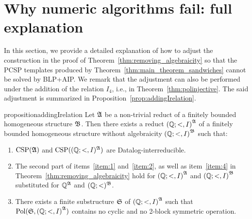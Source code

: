 \section{Why numeric algorithms fail: full explanation}  

 In this section, we provide a detailed explanation of how to adjust the construction in the proof of Theorem~\ref{thm:removing_algebraicity} so that the PCSP templates produced by Theorem~\ref{thm:main_theorem_sandwiches} cannot be solved by BLP+AIP.
 We remark that the adjustment can also be performed under the addition of the relation $I_4$, i.e., in Theorem~\ref{thm:polinjective}.  
%
The said adjustment is summarized in Proposition~\ref{prop:addingIrelation}.
%
\begin{restatable}{proposition}{addingIrelation}    \label{prop:addingIrelation}
    Let $\mathfrak{A}$ be a non-trivial reduct of a finitely bounded homogeneous structure $\mathfrak{B}$.
    Then there exists a reduct ${(\mathbb{Q};<,I)}^{\mathfrak{A}}$ of a finitely bounded homogeneous structure without algebraicity ${(\mathbb{Q};<,I)}^{\mathfrak{B}}$ such that:
    \begin{enumerate}
        \item \label{item:addingIdatalog} $\mathrm{CSP}(\mathfrak{A})$ and  $\mathrm{CSP}((\mathbb{Q};<,I)^{\mathfrak{A}})$ are Datalog-interreducible.
        \item \label{item:removingalgebitems} The second part of items~\ref{item:1} and~\ref{item:2}, as well as item~\ref{item:4} in Theorem~\ref{thm:removing_algebraicity} hold for ${(\mathbb{Q};<,I)}^{\mathfrak{A}}$ and ${(\mathbb{Q};<,I)}^{\mathfrak{B}}$ substituted for $\mathbb{Q}^{\mathfrak{A}}$ and $(\mathbb{Q};<)^{\mathfrak{B}}$.
        \item \label{item:no2blocksymmpol} There exists a finite substructure $\mathfrak{S}$ of  ${(\mathbb{Q};<,I)}^{\mathfrak{A}}$  such that $\mathrm{Pol}(\mathfrak{S},{(\mathbb{Q};<,I)}^{\mathfrak{A}})$ contains no cyclic and no 2-block symmetric operation.
        \end{enumerate}
        
\end{restatable} 

